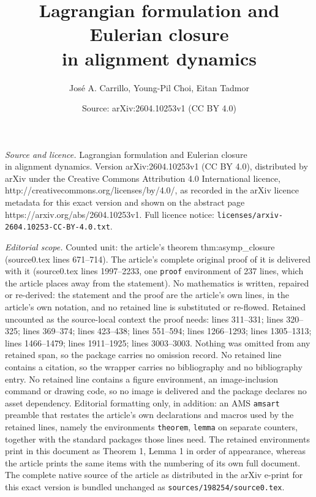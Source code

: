 \documentclass[10pt,a4paper]{amsart}
\title{Lagrangian formulation and Eulerian closure\\in alignment dynamics}
\author{Jos\'e A. Carrillo, Young-Pil Choi, Eitan Tadmor}
\date{Source: arXiv:2604.10253v1 (CC BY 4.0)}
\begin{document}
\maketitle

\noindent\emph{Source and licence.} Lagrangian formulation and Eulerian closure\\in alignment dynamics. Version arXiv:2604.10253v1 (CC BY 4.0), distributed by arXiv under the Creative Commons Attribution 4.0 International licence, http://creativecommons.org/licenses/by/4.0/, as recorded in the arXiv licence metadata for this exact version and shown on the abstract page https://arxiv.org/abs/2604.10253v1. Full licence notice: \texttt{licenses/arxiv-2604.10253-CC-BY-4.0.txt}.\par\smallskip

\noindent\textit{Editorial scope.} Counted unit: the article's theorem thm:asymp\_closure (source0.tex lines 671--714). The article's complete original proof of it is delivered with it (source0.tex lines 1997--2233, one \texttt{proof} environment of 237 lines, which the article places away from the statement). No mathematics is written, repaired or re-derived: the statement and the proof are the article's own lines, in the article's own notation, and no retained line is substituted or re-flowed.  Retained uncounted as the source-local context the proof needs: lines 311--331; lines 320--325; lines 369--374; lines 423--438; lines 551--594; lines 1266--1293; lines 1305--1313; lines 1466--1479; lines 1911--1925; lines 3003--3003.  Nothing was omitted from any retained span, so the package carries no omission record.  No retained line contains a citation, so the wrapper carries no bibliography and no bibliography entry.  No retained line contains a figure environment, an image-inclusion command or drawing code, so no image is delivered and the package declares no asset dependency.  Editorial formatting only, in addition: an AMS \texttt{amsart} preamble that restates the article's own declarations and macros used by the retained lines, namely the environments \texttt{theorem}, \texttt{lemma} on separate counters, together with the standard packages those lines need.  The retained environments print in this document as Theorem 1, Lemma 1 in order of appearance, whereas the article prints the same items with the numbering of its own full document.  The complete native source of the article as distributed in the arXiv e-print for this exact version is bundled unchanged as \texttt{sources/198254/source0.tex}.
%
%
%
%
\end{document}
